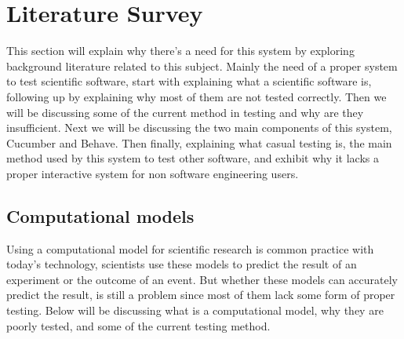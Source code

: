 \chapter{Literature Survey}

This section will explain why there’s a need for this system by exploring background literature related to this subject. Mainly the need of a proper system to test scientific software, start with explaining what a scientific software is, following up by explaining why most of them are not tested correctly. Then we will be discussing some of the current method in testing and why are they insufficient. Next we will be discussing the two main components of this system, Cucumber and Behave. Then finally, explaining what casual testing is, the main method used by this system to test other software, and exhibit why it lacks a proper interactive system for non software engineering users. 

\section{Computational models}
Using a computational model for scientific research is common practice with today’s technology, scientists use these models to predict the result of an experiment or the outcome of an event. But whether these models can accurately predict the result, is still a problem since most of them lack some form of proper testing. Below will be discussing what is a computational model, why they are poorly tested, and some of the current testing method.

